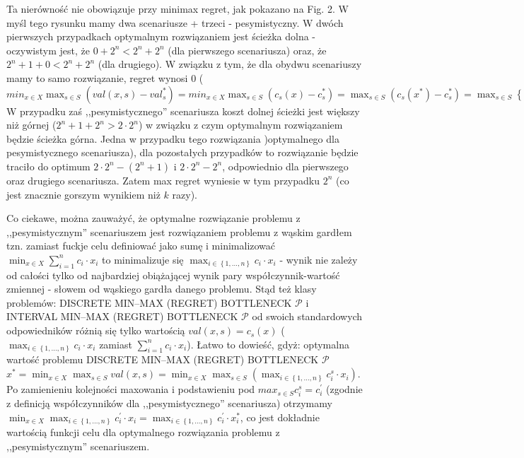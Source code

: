 Ta nierówność nie obowiązuje przy minimax regret, jak pokazano na Fig. 2. W myśl tego rysunku mamy dwa scenariusze + trzeci - pesymistyczny. W dwóch pierwszych przypadkach optymalnym rozwiązaniem jest ścieżka dolna - oczywistym jest, że $0 + 2^n < 2^n + 2^n$ (dla pierwszego scenariusza) oraz, że $2^n + 1 + 0 < 2^n + 2^n$ (dla drugiego). W związku z tym, że dla obydwu scenariuszy mamy to samo rozwiązanie, regret wynosi $0$ ($min_{x \in X} \max_{s \in S} \left( val \left( x, s \right) - val^{\ast}_{s} \right) = min_{x \in X} \max_{s \in S} \left( c_{s} \left( x \right) - c^{\ast}_{s} \right) = \max_{s \in S} \left( c_{s} \left( x^{\ast} \right) - c^{\ast}_{s} \right) = \max_{s \in S} \left\{ \left( 2^n + 1 + 0 \right) - \left( 2^n + 1 + 0 \right), \left( 0 + 2^n \right) - \left( 0 + 2^n \right) \right\} = \max_{s \in S} \left\{ 0, 0 \right\} = 0$ W przypadku zaś ,,pesymistycznego'' scenariusza koszt dolnej ścieżki jest większy niż górnej ($2^n + 1 + 2^n > 2 \cdot 2^n$) w związku z czym optymalnym rozwiązaniem będzie ścieżka górna. Jedna w przypadku tego rozwiązania )optymalnego dla pesymistycznego scenariusza), dla pozostałych przypadków to rozwiązanie będzie traciło do optimum $2 \cdot 2^n - \left( 2^n + 1 \right)$ i $ 2 \cdot 2^n - 2^n$, odpowiednio dla pierwszego oraz drugiego scenariusza. Zatem max regret wyniesie w tym przypadku $2^n$ (co jest znacznie gorszym wynikiem niż $k$ razy).

Co ciekawe, można zauważyć, że optymalne rozwiązanie problemu z ,,pesymistycznym'' scenariuszem jest rozwiązaniem problemu z wąskim gardłem tzn. zamiast fuckje celu definiować jako sumę i minimalizować $\min_{x \in X} \sum_{i=1}^{n} c_{i} \cdot x_{i}$ to minimalizuje się $\max_{i \in \left\{ 1, \dots, n \right\}} c_{i} \cdot x_{i}$ - wynik nie zależy od całości tylko od najbardziej obiążającej wynik pary współczynnik-wartość zmiennej - słowem od wąskiego gardła danego problemu. Stąd też klasy problemów: DISCRETE MIN–MAX (REGRET) BOTTLENECK $\mathscr{P}$ i INTERVAL MIN–MAX (REGRET) BOTTLENECK $\mathscr{P}$ od swoich standardowych odpowiedników różnią się tylko wartością $val \left( x, s \right) = c_{s} \left( x \right)$ ($\max_{i \in \left\{ 1, \dots, n \right\}} c_{i} \cdot x_{i}$ zamiast $\sum_{i=1}^{n} c_{i} \cdot x_{i}$). Łatwo to dowieść, gdyż: optymalna wartość problemu DISCRETE MIN–MAX (REGRET) BOTTLENECK $\mathscr{P}$ $x^{\ast} = \min_{x \in X} \max_{s \in S} val \left( x, s \right) = \min_{x \in X} \max_{s \in S} \left( \max_{i \in \left\{ 1, \dots, n \right\}} c^{s}_{i} \cdot x_{i} \right)$. Po zamienieniu kolejności maxowania i podstawieniu pod $max_{s \in S} c_{i}^{s} = c_{i}^{\prime}$ (zgodnie z definicją współczynników dla ,,pesymistycznego'' scenariusza) otrzymamy $\min_{x \in X} \max_{i \in \left\{ 1, \dots, n \right\}} c_{i}^{\prime} \cdot x_{i} = \max_{i \in \left\{ 1, \dots, n \right\}} c_{i}^{\prime} \cdot x^{\ast}_{i}$, co jest dokładnie wartością funkcji celu dla optymalnego rozwiązania problemu z ,,pesymistycznym'' scenariuszem.

